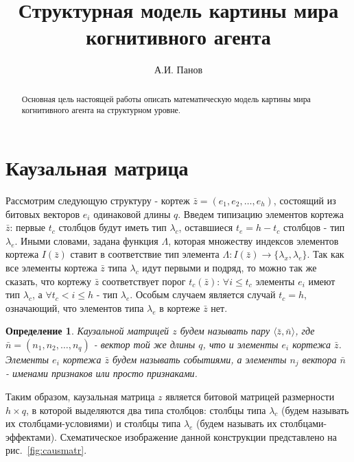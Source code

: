 \documentclass[a4paper,12pt]{article}
\begin{document}
\newtheorem{Th}{Теорема}
\newtheorem{Def}{Определение}
\newtheorem{Pred}{Утверждение}

\author{А.И. Панов}
\title{Структурная модель картины мира когнитивного агента}

\maketitle{}

\begin{abstract}
Основная цель настоящей работы описать математическую модель картины мира когнитивного агента на структурном уровне. 
\end{abstract}

\section{Каузальная матрица}

Рассмотрим следующую структуру - кортеж $\bar z=(e_1, e_2,\dots,e_h)$, состоящий из битовых векторов $e_i$ одинаковой длины $q$. Введем типизацию элементов кортежа $\bar z$: первые $t_c$ столбцов будут иметь тип $\lambda_c$, оставшиеся $t_e=h-t_c$ столбцов - тип $\lambda_e$. Иными словами, задана функция $\Lambda$, которая множеству индексов элементов кортежа $I(\bar z)$ ставит в соответствие тип элемента $\Lambda: I(\bar z)\rightarrow \{\lambda_x,\lambda_e\}$. Так как все элементы кортежа $\bar z$ типа $\lambda_c$ идут первыми и подряд, то можно так же сказать, что кортежу $\bar z$ соответствует порог $t_c(\bar z)$: $\forall i\leq t_c$ элементы $e_i$ имеют тип $\lambda_c$, а $\forall t_c<i\leq h$ - тип $\lambda_e$. Особым случаем является случай $t_c=h$, означающий, что элементов типа $\lambda_e$ в кортеже $\bar z$ нет.

\begin{Def}
Каузальной матрицей $z$ будем называть пару $\langle\bar z, \bar n\rangle$, где $\bar n=(n_1,n_2,\dots,n_q)$ - вектор той же длины $q$, что и элементы $e_i$ кортежа $\bar z$. Элементы $e_i$ кортежа $\bar z$ будем называть событиями, а элементы $n_j$ вектора $\bar n$ - именами признаков или просто признаками. 
\end{Def}

Таким образом, каузальная матрица $z$ является битовой матрицей размерности $h\times q$, в которой выделяются два типа столбцов: столбцы типа $\lambda_c$ (будем называть их столбцами-условиями) и столбцы типа $\lambda_e$ (будем называть их столбцами-эффектами). Схематическое изображение данной конструкции представлено на рис.~\ref{fig:causmatr}.
\end{document}
